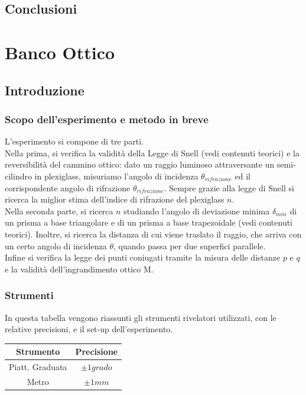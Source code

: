 \documentclass[a4paper,10pt]{report}
\begin{document}
\section{Conclusioni}
\chapter{Banco Ottico}
\section{Introduzione}
\subsection{Scopo dell'esperimento e metodo in breve}
L'esperimento si compone di tre parti.
\\

Nella prima, si verifica la validità della Legge di Snell (vedi contenuti teorici) e la reversibilità del cammino ottico: dato un raggio luminoso attraversante un semi-cilindro in plexiglass, misuriamo l'angolo di incidenza $\theta_{rifrazione}$ ed il corrispondente  angolo di rifrazione $\theta_{rifrazione}$. Sempre grazie alla legge di Snell si ricerca la miglior stima dell'indice di rifrazione del plexiglass $n$.
\\

Nella seconda parte, si ricerca $n$ studiando l'angolo di deviazione minima $\delta_{min}$ di un prisma a base triangolare e di un prisma a base trapezoidale (vedi contenuti teorici). 
Inoltre, si ricerca la distanza di cui viene traslato il raggio, che arriva con un certo angolo di incidenza $\theta$, quando passa per due superfici parallele.
\\

Infine si verifica la legge dei punti coniugati tramite la misura delle distanze $p$ e $q$ e la validità dell'ingrandimento ottico M. 

\subsection{Strumenti}
In questa tabella vengono riassunti gli strumenti rivelatori utilizzati, con le relative precisioni, e il set-up dell'esperimento.\\
\begin{center}
\begin{tabular}{c|c}
Strumento & Precisione \\
\midrule
Piatt. Graduata & $\pm 1 grado $ \\
Metro & $\pm 1 mm $\\
\end{tabular}
\end{center}
\end{document}
